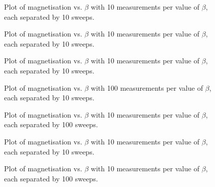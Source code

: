 \documentclass[a4paper]{article}
\begin{document}
\clearpage
\begin{figure}[ht!]
	\centering
	
	\caption{Plot of magnetisation vs. $\beta$ with 10 measurements per value of $\beta$, each separated by 10 sweeps.}\label{Fig_mag_plot_100}
\end{figure}

\clearpage
\begin{figure}[ht!]
	\centering
	
	\caption{Plot of magnetisation vs. $\beta$ with 10 measurements per value of $\beta$, each separated by 10 sweeps.}\label{Fig_mag_plot_150}
\end{figure}

\clearpage
\begin{figure}[ht!]
	\centering
	
	\caption{Plot of magnetisation vs. $\beta$ with 10 measurements per value of $\beta$, each separated by 10 sweeps.}\label{Fig_mag_plot_175_sweeps_1100}
\end{figure}

\clearpage
\begin{figure}[ht!]
	\centering
	
	\caption{Plot of magnetisation vs. $\beta$ with 100 measurements per value of $\beta$, each separated by 10 sweeps.}\label{Fig_mag_plot_175_sweeps_11000_10sep}
\end{figure}

\clearpage
\begin{figure}[ht!]
	\centering
	
	\caption{Plot of magnetisation vs. $\beta$ with 10 measurements per value of $\beta$, each separated by 100 sweeps.}\label{Fig_mag_plot_175_sweeps_11000_100sep}
\end{figure}

\clearpage
\begin{figure}[ht!]
	\centering
	
	\caption{Plot of magnetisation vs. $\beta$ with 10 measurements per value of $\beta$, each separated by 10 sweeps.}\label{Fig_mag_plot_250_2}
\end{figure}

\clearpage
\begin{figure}[ht!]
	\centering
	
	\caption{Plot of magnetisation vs. $\beta$ with 10 measurements per value of $\beta$, each separated by 100 sweeps.}\label{Fig_mag_plot_250_sweeps_11000_100sep}
\end{figure}
\end{document}
